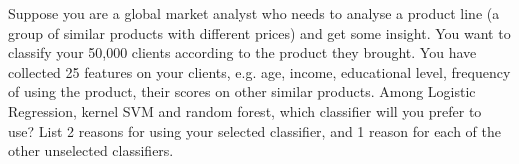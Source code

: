 Suppose you are a global market analyst who needs to analyse a product line (a group of similar products with different prices) and get some insight. You want to classify your 50,000 clients according to the product they brought. You have collected 25 features on your clients, e.g. age, income, educational level, frequency of using the product, their scores on other similar products. Among Logistic Regression, kernel SVM and random forest, which classifier will you prefer to use? List 2 reasons for using your selected classifier, and 1 reason for each of the other unselected classifiers.
